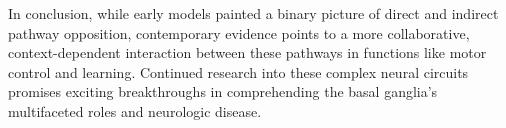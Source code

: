 \documentclass[10pt]{article}
\begin{document}
\begin{sloppypar}
  In conclusion, while early models painted a binary picture of direct and indirect pathway opposition, contemporary evidence points to a more collaborative, context-dependent interaction between these pathways in functions like motor control and learning. Continued research into these complex neural circuits promises exciting breakthroughs in comprehending the basal ganglia’s multifaceted roles and neurologic disease.

  \pagebreak
  \singlespacing %
  
  

\end{sloppypar}
\end{document}
